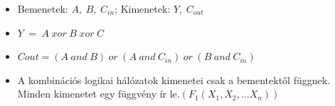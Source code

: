 \documentclass[11pt,a4paper]{article}
\begin{document}
            \begin{tcolorbox}[colback=blue!5!white,colframe=blue!50!black,title= 8. Ismertesse az 1 bites teljes összeadó példáján keresztül a kombinációs logikai hálózatok elvét!]
                \begin{center}
                \end{center}
                \begin{itemize}
                    \item Bemenetek: \(A,\hspace{3pt}B,\hspace{3pt}C_{in}\); Kimenetek: \(Y,\hspace{3pt}C_{out}\)
                    \item \(Y\hspace{3pt}=\hspace{3pt}A\hspace{3pt}xor\hspace{3pt}B\hspace{3pt}xor\hspace{3pt}C\)
                    \item \(C{out} = (A\hspace{3pt}and\hspace{3pt}B)\hspace{3pt}or\hspace{3pt}(A\hspace{3pt}and\hspace{3pt}C_{in})\hspace{3pt}or\hspace{3pt}(B\hspace{3pt}and\hspace{3pt}C_{in})\)
                    \item A kombinációs logikai hálózatok kimenetei csak a bementektől függnek. Minden kimenetet egy függvény ír le.\((F_1(X_1, X_2, ... X_n))\)
                \end{itemize}
            \end{tcolorbox}
\end{document}
